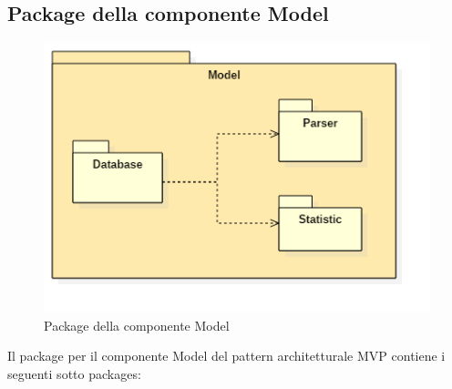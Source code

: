 \documentclass[a4paper,11pt]{article}
\begin{document}
	\subsection{Package della componente Model}
	\begin{figure}[h!]
	\begin{center}
		\includegraphics[scale=0.65]{../images/ModelPackage.png}
		\caption{Package della componente Model}
	\end{center}
	\end{figure}
	Il package per il componente Model del pattern architetturale MVP contiene i seguenti sotto packages:
\end{document}
